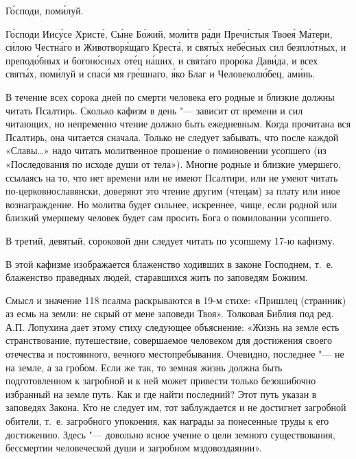 \begin{mymulticols}

\Chestneyshuyu

\slavainynen

Г\'{о}споди, пом\'{и}луй. 

\MolitvamiSviatyhOtecNashih

Г\'{о}споди Иис\'{у}се Христ\'{е}, С\'{ы}не Б\'{о}жий, мол\'{и}тв р\'{а}ди Преч\'{и}стыя Твое\'{я} М\'{а}тери, с\'{и}лою Честн\'{а}го и Животвор\'{я}щаго Крест\'{а}, и свят\'{ы}х неб\'{е}сных сил безпл\'{о}тных, и препод\'{о}бных и богон\'{о}сных от\'{е}ц н\'{а}ших, и свят\'{а}го прор\'{о}ка Дав\'{и}да, и всех свят\'{ы}х, пом\'{и}луй и спас\'{и} мя гр\'{е}шнаго, \'{я}ко Благ и Человекол\'{ю}бец, ам\'{и}нь.

\end{mymulticols}

\mychapterending

\begin{mymulticols}


В течение всех сорока дней по смерти человека его родные и близкие должны читать Псалтирь. Сколько кафизм в день "--- зависит от времени и сил читающих, но непременно чтение должно быть ежедневным. Когда прочитана вся Псалтирь, она читается сначала. Только не следует забывать, что после каждой «Славы…» надо читать молитвенное прошение о поминовении усопшего (из «Последования по исходе души от тела»). Многие родные и близкие умершего, ссылаясь на то, что нет времени или не имеют Псалтири, или не умеют читать по-церковнославянски, доверяют это чтение другим (чтецам) за плату или иное вознаграждение. Но молитва будет сильнее, искреннее, чище, если родной или близкий умершему человек будет сам просить Бога о помиловании усопшего. 

В третий, девятый, сороковой дни следует читать по усопшему 17-ю кафизму. 

В этой кафизме изображается блаженство ходивших в законе Господнем, т.~е. блаженство праведных людей, старавшихся жить по заповедям Божиим. 

Смысл и значение 118 псалма раскрываются в 19-м стихе: «Пришлец (странник) аз есмь на земли: не скрый от мене заповеди Твоя». Толковая Библия под ред. А.П. Лопухина дает этому стиху следующее объяснение: «Жизнь на земле есть странствование, путешествие, совершаемое человеком для достижения своего отечества и постоянного, вечного местопребывания. Очевидно, последнее "--- не на земле, а за гробом. Если же так, то земная жизнь должна быть подготовленном к загробной и к ней может привести только безошибочно избранный на земле путь. Как и где найти последний? Этот путь указан в заповедях Закона. Кто не следует им, тот заблуждается и не достигнет загробной обители, т.~е. загробного упокоения, как награды за понесенные труды к его достижению. Здесь "--- довольно ясное учение о цели земного существования, бессмертии человеческой души и загробном мздовоздаянии». 

\end{mymulticols}

